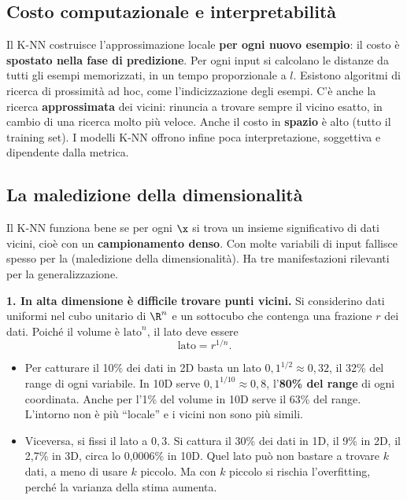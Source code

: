 \subsection{Costo computazionale e interpretabilità}
Il K-NN costruisce l'approssimazione locale \textbf{per ogni nuovo esempio}: il costo è \textbf{spostato nella
fase di predizione}. Per ogni input si calcolano le distanze da tutti gli esempi memorizzati, in un tempo
proporzionale a $l$. Esistono algoritmi di ricerca di prossimità ad hoc, come l'indicizzazione degli esempi. C'è
anche la ricerca \textbf{approssimata} dei vicini: rinuncia a trovare sempre il vicino esatto, in cambio di una
ricerca molto più veloce. Anche il costo in \textbf{spazio} è alto (tutto il training set). I modelli
K-NN offrono infine poca interpretazione, soggettiva e dipendente dalla metrica.

\subsection{La maledizione della dimensionalità}
\label{sec:curse}

Il K-NN funziona bene se per ogni $\x$ si trova un insieme significativo di dati vicini, cioè con un
\textbf{campionamento denso}. Con molte variabili di input fallisce spesso per la  (maledizione della dimensionalità). Ha tre manifestazioni rilevanti per la generalizzazione.

\textbf{1. In alta dimensione è difficile trovare punti vicini.} Si considerino dati uniformi nel cubo unitario
di $\R^n$ e un sottocubo che contenga una frazione $r$ dei dati. Poiché il volume è $\text{lato}^n$, il lato
deve essere
\[
\text{lato} = r^{1/n}.
\]
\begin{itemize}
  \item Per catturare il 10\% dei dati in 2D basta un lato $0{,}1^{1/2}\approx0{,}32$, il 32\% del range di
        ogni variabile. In 10D serve $0{,}1^{1/10}\approx0{,}8$, l'\textbf{80\% del range} di ogni coordinata.
        Anche per l'1\% del volume in 10D serve il 63\% del range. L'intorno non è più ``locale'' e i vicini non
        sono più simili.
  \item Viceversa, si fissi il lato a $0{,}3$. Si cattura il 30\% dei dati in 1D, il 9\% in 2D, il 2,7\% in 3D,
        circa lo 0,0006\% in 10D. Quel lato può non bastare a trovare $k$ dati, a meno di usare $k$ piccolo. Ma
        con $k$ piccolo si rischia l'overfitting, perché la varianza della stima aumenta.
\end{itemize}

